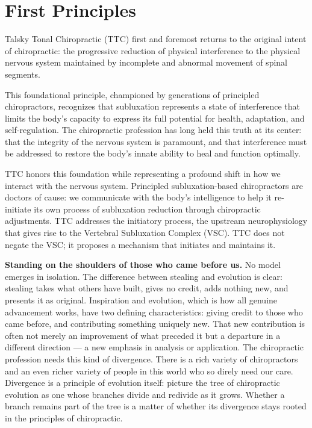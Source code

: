 \documentclass[11pt,letterpaper]{article}
\begin{document}
\section{First Principles}

Talsky Tonal Chiropractic (TTC) first and foremost returns to the original intent of chiropractic: the progressive reduction of physical interference to the physical nervous system maintained by incomplete and abnormal movement of spinal segments.


This foundational principle, championed by generations of principled chiropractors, recognizes that subluxation represents a state of interference that limits the body's capacity to express its full potential for health, adaptation, and self-regulation. The chiropractic profession has long held this truth at its center: that the integrity of the nervous system is paramount, and that interference must be addressed to restore the body's innate ability to heal and function optimally.


TTC honors this foundation while representing a profound shift in how we interact with the nervous system. Principled subluxation-based chiropractors are doctors of cause: we communicate with the body's intelligence to help it re-initiate its own process of subluxation reduction through chiropractic adjustments. TTC addresses the initiatory process, the upstream neurophysiology that gives rise to the Vertebral Subluxation Complex (VSC). TTC does not negate the VSC; it proposes a mechanism that initiates and maintains it.


\textbf{Standing on the shoulders of those who came before us.} No model emerges in isolation. The difference between stealing and evolution is clear: stealing takes what others have built, gives no credit, adds nothing new, and presents it as original. Inspiration and evolution, which is how all genuine advancement works, have two defining characteristics: giving credit to those who came before, and contributing something uniquely new. That new contribution is often not merely an improvement of what preceded it but a departure in a different direction — a new emphasis in analysis or application. The chiropractic profession needs this kind of divergence. There is a rich variety of chiropractors and an even richer variety of people in this world who so direly need our care. Divergence is a principle of evolution itself: picture the tree of chiropractic evolution as one whose branches divide and redivide as it grows. Whether a branch remains part of the tree is a matter of whether its divergence stays rooted in the principles of chiropractic.
\end{document}
